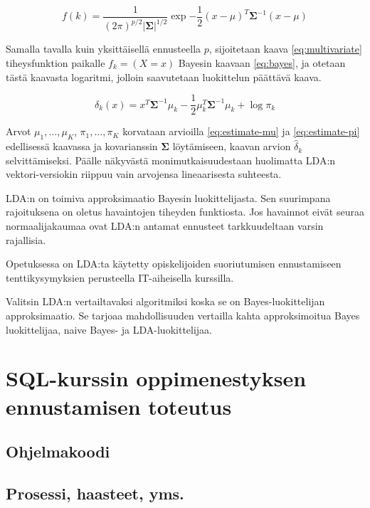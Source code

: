 \documentclass[finnish,twoside,openright]{HYgraduMLDS}
\begin{document}
\begin{equation} \label{eq:multivariate}
    f(k) = \frac{1}{(2\pi)^{p/2} |\pmb{\Sigma}|^{1/2}} \exp{-\frac{1}{2} (x - \mu)^T \pmb{\Sigma}^{-1} (x - \mu)}
\end{equation}

Samalla tavalla kuin yksittäisellä ennusteella $p$, sijoitetaan kaava \ref{eq:multivariate} tiheysfunktion paikalle $f_k = (X = x)$ Bayesin kaavaan \ref{eq:bayes}, ja otetaan tästä kaavasta logaritmi, jolloin saavutetaan luokittelun päättävä kaava.

\begin{equation}
    \delta_k(x) = x^T \pmb{\Sigma}^{-1} \mu_k - \frac{1}{2} \mu_k^T \pmb{\Sigma}^{-1} \mu_k + \log \pi_k
\end{equation}

Arvot $\mu_1, \dots, \mu_K$, $\pi_1, \dots, \pi_K$ korvataan arvioilla \ref{eq:estimate-mu} ja \ref{eq:estimate-pi} edellisessä kaavassa ja kovarianssin $\pmb{\Sigma}$ löytämiseen, kaavan arvion $\hat{\delta}_k$ selvittämiseksi. Päälle näkyvästä monimutkaisuudestaan huolimatta LDA:n vektori-versiokin riippuu vain arvojensa lineaarisesta suhteesta.

LDA:n on toimiva approksimaatio Bayesin luokittelijasta\cite{james2013ISLR}. Sen suurimpana rajoituksena on oletus havaintojen tiheyden funktiosta. Jos havainnot eivät seuraa normaalijakaumaa ovat LDA:n antamat ennusteet tarkkuudeltaan varsin rajallisia.

Opetuksessa on LDA:ta käytetty opiskelijoiden suoriutumisen ennustamiseen tenttikysymyksien perusteella\cite{7265316} IT-aiheisella kurssilla. 

Valitsin LDA:n vertailtavaksi algoritmiksi koska se on Bayes-luokittelijan approksimaatio. Se tarjoaa mahdollisuuden vertailla kahta approksimoitua Bayes luokittelijaa, naive Bayes- ja LDA-luokittelijaa.


\chapter{SQL-kurssin oppimenestyksen ennustamisen toteutus}

\section{Ohjelmakoodi}


\section{Prosessi, haasteet, yms.}
\end{document}
